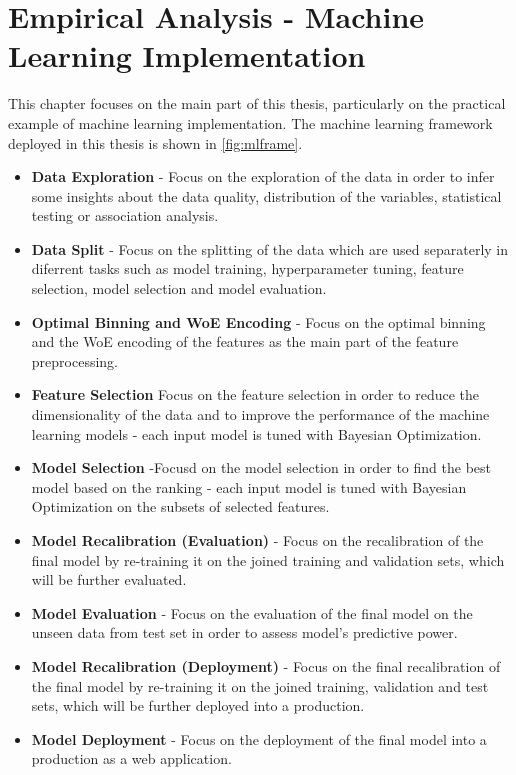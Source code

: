\chapter{Empirical Analysis - Machine Learning Implementation}
\label{chap:four}
This chapter focuses on the main part of this thesis, particularly on the practical example of machine learning implementation. The machine learning framework deployed in this thesis is shown in \autoref{fig:mlframe}.
\begin{itemize}\setlength\itemsep{0em}
\item \textbf{Data Exploration} - Focus on the exploration of the data in order to infer some insights about the data quality, distribution of the variables, statistical testing or association analysis.
\item \textbf{Data Split} - Focus on the splitting of the data which are used separaterly in diferrent tasks such as model training, hyperparameter tuning, feature selection, model selection and model evaluation.
\item \textbf{Optimal Binning and WoE Encoding} - Focus on the optimal binning and the WoE encoding of the features as the main part of the feature preprocessing.
\item \textbf{Feature Selection} Focus on the feature selection in order to reduce the dimensionality of the data and to improve the performance of the machine learning models - each input model is tuned with Bayesian Optimization.
\item \textbf{Model Selection} -Focusd on the model selection in order to find the best model based on the ranking - each input model is tuned with Bayesian Optimization on the subsets of selected features.
\item \textbf{Model Recalibration (Evaluation)} - Focus on the recalibration of the final model by re-training it on the joined training and validation sets, which will be further evaluated.
\item \textbf{Model Evaluation} - Focus on the evaluation of the final model on the unseen data from test set in order to assess model's predictive power.
\item \textbf{Model Recalibration (Deployment)} - Focus on the final recalibration of the final model by re-training it on the joined training, validation and test sets, which will be further deployed into a production.
\item \textbf{Model Deployment} - Focus on the deployment of the final model into a production as a web application.
\end{itemize}


